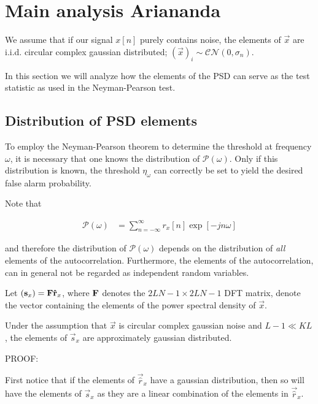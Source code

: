 \documentclass[a4paper, openany, oneside]{memoir}
\begin{document}
\section{Main analysis Ariananda}

We assume that if our signal $x[n]$ purely contains noise, the elements of $\vec{x}$ are i.i.d. circular complex gaussian distributed; $(\vec{x})_i \sim \mathcal{CN}(0,\sigma_n)$. 

In this section we will analyze how the elements of the PSD can serve as the test statistic as used in the Neyman-Pearson test. 

\subsection{Distribution of PSD elements}
To employ the Neyman-Pearson theorem to determine the threshold at frequency $\omega$, it is necessary that one knows the distribution of $\mathcal{P}\left(\omega\right)$. Only if this distribution is known, the threshold $\eta_{\omega}$ can correctly be set to yield the desired false alarm probability.

Note that 

\begin{align*}
\mathcal{P}\left(\omega\right) &= \sum_{n=-\infty}^{\infty} r_{x}[n] \exp\left[-jn\omega\right]
\end{align*}

and therefore the distribution of $\mathcal{P}(\omega)$ depends on the distribution of \emph{all} elements of the autocorrelation. Furthermore, the elements of the autocorrelation, can in general not be regarded as independent random variables. 

Let $(\boldsymbol{\mathbf{s}}_x) = \boldsymbol{\mathbf{F}} \boldsymbol{\mathbf{\hat{r}}}_x$, where $\boldsymbol{\mathbf{F}}$ denotes the $2LN-1 \times 2LN-1$ DFT matrix, denote the vector containing the elements of the power spectral density of $\vec{x}$.

\begin{blockTheorem}
Under the assumption that $\vec{x}$ is circular complex gaussian noise and $L-1 \ll KL$, the elements of $\vec{s}_x$ are approximately gaussian distributed.
\end{blockTheorem}

PROOF:

First notice that if the elements of $\vec{\hat{r}}_x$ have a gaussian distribution, then so will have the elements of $\vec{s}_x$ as they are a linear combination of the elements in $\vec{\hat{r}}_x$.
\end{document}
